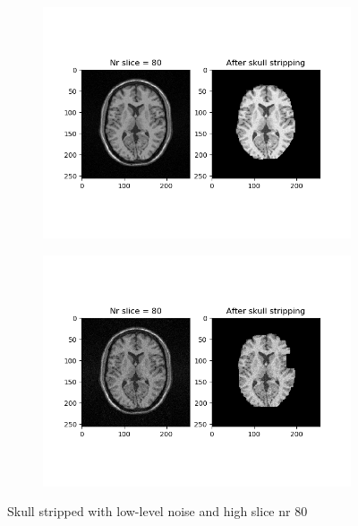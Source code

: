 \begin{figure}[H]
	\centering
	\begin{subfigure}[b]{0.35\linewidth}
		\includegraphics[scale=0.35]{figures/Module_08/M8_9.png}
	\end{subfigure}
		\begin{subfigure}[b]{0.35\linewidth}
		\includegraphics[scale=0.35]{figures/Module_08/M8_n9.png}
	\end{subfigure}
	\caption{Skull stripped with low-level noise and high slice nr 80}
	\label{fig:figures/m08_9}
\end{figure}

